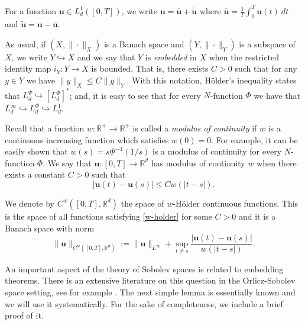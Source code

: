 \documentclass[twoside]{elsarticle}
\theoremstyle{remark}
\newcommand{\lphi}{L^{\Phi}}
\newcommand{\lpsi}{L^{\Psi}}
\renewcommand{\b}[1]{\boldsymbol{#1}}
\newcommand{\rr}{\mathbb{R}}
\renewcommand{\leq}{\leqslant}
\begin{document}
For a  function $\b{u}\in L^1_d([0,T])$, we write $\b{u}=\overline{\b{u}}+\widetilde{\b{u}}$ where $\overline{\b{u}} =\frac1T\int_0^T \b{u}(t)\ dt$ and $\widetilde{\b{u}}=\b{u}-\overline{\b{u}}$.

As usual, if $(X,\|\cdot\|_X)$ is a Banach space and $(Y,\|\cdot \|_Y)$ is a subspace of $X$,  we write $Y\hookrightarrow X$ and we say that $Y$ is \emph{embedded} in $X$  when the restricted identity map $i_Y:Y\to X$ is bounded. That is, there exists $C>0$ such that  for any $y\in Y$ we have $\|y\|_X\leq C\|y\|_Y$.  With this notation, H\"older's inequality states that  $\lpsi_d\hookrightarrow  \left[\lphi_d\right]^*$; and, it is easy to see that for every $N$-function $\Phi$ we have that $L^{\infty}_d\hookrightarrow\lphi_d \hookrightarrow L^1_d$.


 Recall that a function   $w:\mathbb{R}^+\to \mathbb{R}^+$ is called  a \emph{modulus of continuity} if $w$ is a continuous increasing function which satisfies $w(0)=0$. For example, it can be easily shown that $w(s)=s\Phi^{-1}(1/s)$ is a modulus of  continuity for every $N$-function $\Phi$.  We say that $\b{u}:[0,T]\to\rr^d$  has modulus of continuity $w$  when there exists a constant $C>0$ such that 
\begin{equation}\label{w-holder}|\b{u}(t)-\b{u}(s)|\leq Cw(|t-s|).
\end{equation}


We denote by $C^w([0,T],\rr^d)$  the space of  $w$-H\"older continuous functions. This is the space of all functions satisfying \eqref{w-holder} for some $C>0$ and it is a Banach space with norm
\[\|\b{u}\|_{  C^w([0,T],\rr^d) }  :=\|\b{u}\|_{L^{\infty}}+\sup\limits_{t\neq s}\frac{|\b{u}(t)-\b{u}(s)|}{w(|t-s|)}.\]





 An important aspect of the theory of Sobolev spaces is related to embedding theorems. There is an extensive literature on this question in the  Orlicz-Sobolev space setting, see for example
 \cite{cianchi2000fully,cianchi1999some,claverooptimal,edmunds2000optimal,kerman2006optimal}.
The next simple lemma is essentially known and we will use it systematically. For the sake of completeness, we include a brief proof of it.
\end{document}
